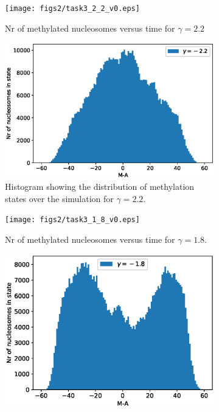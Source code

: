 \documentclass{article}
\begin{document}
\begin{figure}[H]
	\centering
	\begin{subfigure}[b]{.49\textwidth}
		\centering
		\texttt{[image: figs2/task3\_2\_2\_v0.eps]}
		\caption{Nr of methylated nucleosomes versus time for $\gamma=2.2$ }
		\label{fig:task3_m_vs_t_2_2}
	\end{subfigure}
	\begin{subfigure}[b]{.49\textwidth}
		\centering
		\includegraphics[width= \linewidth]{figs2/task3_hist_2_2_v0.eps}
		\caption{Histogram showing the distribution of methylation states over the simulation for $\gamma=2.2$.}
		\label{fig:task3_hist_2_2}
	\end{subfigure}
	\begin{subfigure}[b]{.49\textwidth}
		\centering
		\texttt{[image: figs2/task3\_1\_8\_v0.eps]}
		\caption{Nr of methylated nucleosomes versus time for $\gamma=1.8$.}
		\label{fig:task3_m_vs_t_1_8}
	\end{subfigure}
	\begin{subfigure}[b]{.49\textwidth}
		\centering
		\includegraphics[width= \linewidth]{figs2/task3_hist_1_8_v0.eps}

\end{subfigure}
\end{figure}
\end{document}
